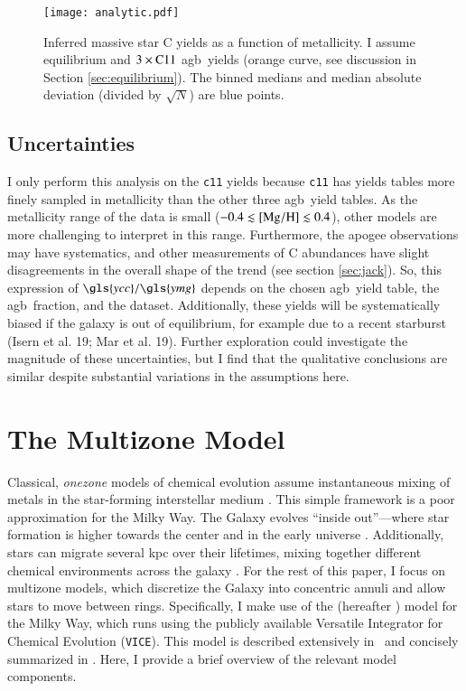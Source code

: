 \documentclass[12pt,oneside,letterpaper]{report}
\newcommand{\agb}{\gls{agb}}
\newcommand{\apogee}{\gls{apogee}}
\newcommand{\cxi}{\texttt{\gls{c11}}}
\newcommand{\Ycc}{\gls{ycc}}
\newcommand{\Yoc}{\gls{ymg}}
\newcommand{\JJ}{\citetalias{james+21}}
\newcommand{\VICE}{\texttt{VICE}}
\begin{document}
\begin{figure}[htp]
    \centering
    \texttt{[image: analytic.pdf]}
    \caption[Reverse fit yields]{Inferred massive star C yields as a function of metallicity. I assume equilibrium and $3\times {\rm C11}$ \agb\ yields (orange curve, see discussion in Section \ref{sec:equilibrium}). The binned medians and median absolute deviation (divided by $\sqrt{N}$) are blue points.
    }
    \label{fig:analytic}
\end{figure}





\section{Uncertainties}

I only perform this analysis on the \cxi{} yields because \cxi{} has yields tables more finely sampled in metallicity than the other three \agb\ yield tables. As the metallicity range of the data is small ($-0.4\lesssim {\rm [Mg/H]} \lesssim 0.4$), other models are more challenging to interpret in this range. Furthermore, the \apogee{} observations may have systematics, and other measurements of C abundances \citep[e.g.][]{vincenzo+21} have slight disagreements in the overall shape of the trend (see section \ref{sec:jack}).
So, this expression of $\Ycc/\Yoc$ depends on the chosen \agb\ yield table, the \agb\ fraction, and the dataset. 
Additionally, these yields will be systematically biased if the galaxy is out of equilibrium, for example due to a recent starburst (Isern et al. 19; Mar et al. 19). Further exploration could investigate the magnitude of these uncertainties, but I find that the qualitative conclusions are similar despite substantial variations in the assumptions here.



\chapter{The Multizone Model}\label{sec:vice}

Classical, \textit{\gls{onezone}} models of chemical evolution assume instantaneous mixing of metals in the star-forming interstellar medium \citep[e.g.][]{matteucci21}. This simple framework is a poor approximation for the Milky Way.  The Galaxy evolves ``inside out''---where star formation is higher towards the center and in the early universe \citep{bird+13}. Additionally, stars can migrate several kpc over their lifetimes, mixing together different chemical environments across the galaxy \citep{bird+12,sellwood+binney02}. For the rest of this paper, I focus on \gls{multizone} models, which discretize the Galaxy into concentric annuli and allow stars to move between rings.  Specifically, I make use of the \citet{james+21} (hereafter \JJ) model for the Milky Way, which runs using the publicly available Versatile Integrator for Chemical Evolution (\VICE). This model is described extensively in \JJ~and concisely summarized  in \citet{james+23}. Here, I provide a brief overview of the relevant model components.
\end{document}
